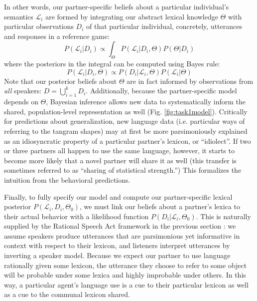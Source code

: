 In other words, our partner-specific beliefs about a particular individual's semantics $\mathcal{L}_i$ are formed by integrating our abstract lexical knowledge $\Theta$ with particular  observations $D_i$ of that particular individual, concretely, utterances and responses in a reference game:
$$%
P(\mathcal{L}_i | D_i)  \propto \int_{\Theta}P(\mathcal{L}_i | D_i,  \Theta) P(\Theta | D_i) 
$$
where the posteriors in the integral can be computed using Bayes rule:
$$
P(\mathcal{L}_i | D_i, \Theta) \propto P(D_i | \mathcal{L}_i, \Theta) P(\mathcal{L}_i | \Theta)
$$
Note that our posterior beliefs about $\Theta$ are in fact informed by observations from \emph{all} speakers: $D = \bigcup_{i=1}^k D_i$. 
Additionally, because the partner-specific model depends on $\Theta$, Bayesian inference allows new data to systematically inform the shared, population-level representation as well (Fig. \ref{fig:task1model}).
Critically for predictions about generalization, new language data (i.e. particular ways of referring to the tangram shapes) may at first be more parsimoniously explained as an idiosyncratic property of a particular partner's lexicon, or ``idiolect''. 
If two or three partners all happen to use the same language, however, it starts to become more likely that a novel partner will share it as well (this transfer is sometimes referred to as ``sharing of statistical strength.'')
This formalizes the intuition from the behavioral predictions.


Finally, to fully specify our model and compute our partner-specific lexical posterior $P(\mathcal{L}_i, D_i, \Theta_0)$, we must link our beliefs about a partner's lexica to their actual behavior with a likelihood function $P(D_i | \mathcal{L}_i, \Theta_0)$. 
This is naturally supplied by the Rational Speech Act framework in the previous section \cite{FrankGoodman12_PragmaticReasoningLanguageGames,GoodmanFrank16_RSATiCS,BergenLevyGoodman16_LexicalUncertainty,SmithGoodmanFrank13_RecursivePragmaticReasoningNIPS}: we assume speakers produce utterances that are parsimonious yet informative in context with respect to their lexicon, and listeners interpret utterances by inverting a speaker model. Because we expect our partner to use language rationally given some lexicon, the utterance they choose to refer to some object will be probable under some lexica and highly improbable under others. 
In this way, a particular agent's language use is a cue to their particular lexicon as well as a cue to the communal lexicon shared. 

